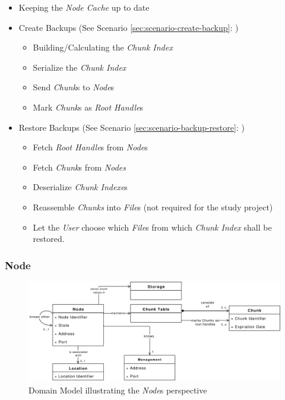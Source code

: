 \begin{itemize}
    \item Keeping the \emph{Node Cache} up to date
    \item Create Backups (See Scenario \ref{sec:scenario-create-backup}: )
    \begin{itemize}
        \item Building/Calculating the \emph{Chunk Index}
        \item Serialize the \emph{Chunk Index}
        \item Send \emph{Chunk}s to \emph{Node}s
        \item Mark \emph{Chunk}s as \emph{Root Handle}s
    \end{itemize}
    \item Restore Backups (See Scenario \ref{sec:scenario-backup-restore}: )
    \begin{itemize}
        \item Fetch \emph{Root Handle}s from \emph{Node}s
        \item Fetch \emph{Chunk}s from \emph{Nodes}
        \item Deserialize \emph{Chunk Indexe}s
        \item Reassemble \emph{Chunks} into \emph{File}s (not required for the study project)
        \item Let the \emph{User} choose which \emph{File}s from which \emph{Chunk Index} shall be restored.
    \end{itemize}
\end{itemize}

\subsubsection{Node}

\begin{figure}[h]
    \centering
    \includegraphics[width=1\linewidth]{resources/node_domain_model}
    \caption[Node Domain Model]{Domain Model illustrating the \emph{Node}s perspective}
\end{figure}

